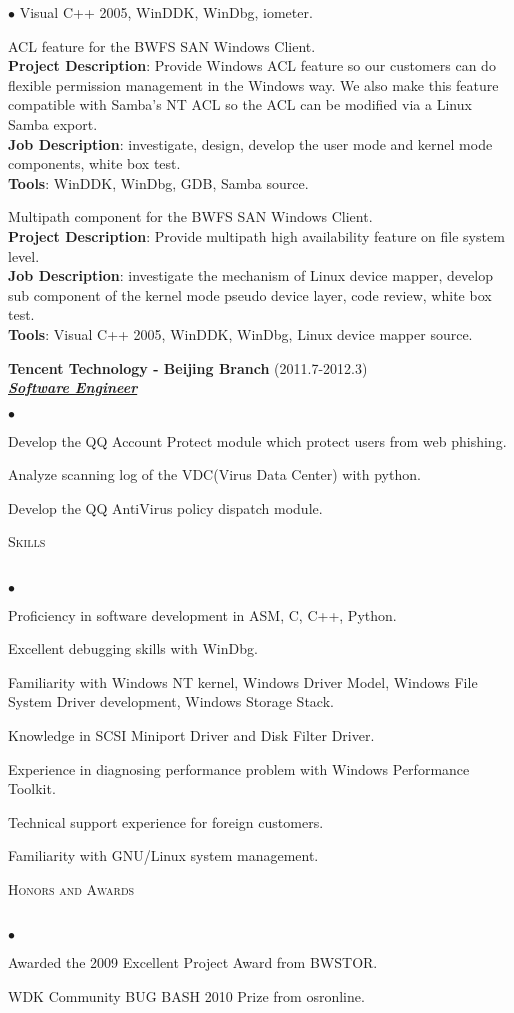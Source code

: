 \documentclass{article}
\newcommand{\lineunder}{\vspace*{-8pt} \\ \hspace*{-18pt} \hrulefill \\}
\newcommand{\header}[1]{{\hspace*{-15pt}\vspace*{6pt} \textsc{#1}} \vspace*{-6pt} \lineunder}
\newcommand{\employer}[3]{{ \textbf{#1} (#2)\\ \underline{\textbf{\emph{#3}}}\\}}
\newcommand{\project}[4]{{#1}\\ \textbf{Project Description}:
  {#2}\\ \textbf{Job Description}: {#3}\\ \textbf{Tools}: {#4}\vspace*{3pt}}
\newenvironment{achievements}{\begin{list}{$\bullet$}{\topsep 0pt
      \itemsep -2pt}}{\vspace*{6pt}\end{list}}
\begin{document}
\begin{achievements}
          {Visual C++ 2005, WinDDK, WinDbg, iometer.}
        \item 
          \project{ACL feature for the BWFS SAN Windows Client.}
          {Provide Windows ACL feature so our customers can do
            flexible permission management in the Windows way. We also
            make this feature compatible with Samba's NT ACL so the
            ACL can be modified via a Linux Samba export.}
          {investigate, design, develop the user mode and kernel mode
            components, white box test.}
          {WinDDK, WinDbg, GDB, Samba source.}
        \item 
          \project{Multipath component for the BWFS SAN Windows Client.}
          {Provide multipath high availability feature on file system
            level.}
          {investigate the mechanism of Linux device mapper, develop
            sub component of the kernel mode pseudo device layer, code
            review, white box test.}
          {Visual C++ 2005, WinDDK, WinDbg, Linux device mapper source.}
	\end{achievements}

\employer{Tencent Technology - Beijing Branch}{2011.7-2012.3} {Software Engineer}
	\begin{achievements}
	\item Develop the QQ Account Protect module which protect users from web phishing.
	\item Analyze scanning log of the VDC(Virus Data Center) with python.
	\item Develop the QQ AntiVirus policy dispatch module.
	\end{achievements}


\header{Skills}
\begin{achievements}
\item Proficiency in software development in ASM, C, C++, Python.
\item Excellent debugging skills with WinDbg.
\item Familiarity with Windows NT kernel, Windows Driver Model,
  Windows File System Driver development, Windows Storage Stack.
\item Knowledge in SCSI Miniport Driver and Disk Filter Driver.
\item Experience in diagnosing performance problem with Windows
  Performance Toolkit.
\item Technical support experience for foreign customers.
\item Familiarity with GNU/Linux system management.
\end{achievements}


\header{Honors and Awards}
\begin{achievements}
\item Awarded the 2009 Excellent Project Award from BWSTOR.
\item WDK Community BUG BASH 2010 Prize from osronline.
\end{achievements}
\end{document}
